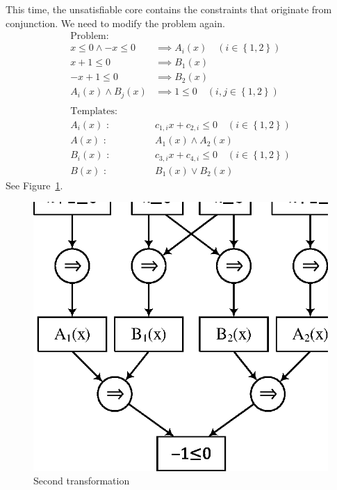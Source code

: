 This time, the unsatisfiable core contains the constraints that
originate from conjunction.  We need to modify the problem again.
\begin{align*}
\text{Problem:} \\
x \leq 0 \wedge -x \leq 0 & \implies A_i(x) \quad (i \in \left\lbrace 1,2 \right\rbrace ) \\
x+1 \leq 0 & \implies B_1(x) \\
-x+1 \leq 0 & \implies B_2(x) \\
A_i(x) \wedge B_j(x) & \implies 1 \leq 0 \quad (i,j \in \left\lbrace 1,2 \right\rbrace ) \\
\\
\text{Templates:} \\
A_i(x) \text{ : } & c_{1,i} x + c_{2,i} \leq 0 \quad (i \in \left\lbrace 1,2 \right\rbrace ) \\
A(x) \text{ : } & A_1(x) \wedge A_2(x) \\
B_i(x) \text{ : } & c_{3,i} x + c_{4,i} \leq 0 \quad (i \in \left\lbrace 1,2 \right\rbrace ) \\
B(x) \text{ : } & B_1(x) \vee B_2(x)
\end{align*}
See Figure~\ref{fig:ex33}.

\begin{figure}
  \begin{center}
    \includegraphics[scale=0.8]{figures/ex3-3.eps}
  \end{center}
  \caption{Second transformation}
  \label{fig:ex33}
\end{figure}


